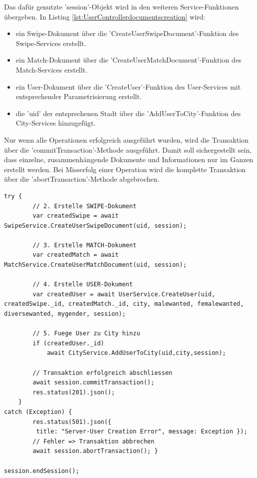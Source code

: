 \noindent
Das dafür genutzte 'session'-Objekt wird in den weiteren Service-Funktionen übergeben. In Listing \ref{lst:UserControllerdocumentscreation} wird:
\begin{itemize}
\item ein Swipe-Dokument über die 'CreateUserSwipeDocument'-Funktion des Swipe-Services erstellt.
\item ein Match-Dokument über die 'CreateUserMatchDocument'-Funktion des Match-Services erstellt. 
\item ein User-Dokument über die 'CreateUser'-Funktion des User-Services mit entsprechender Parametrisierung erstellt.
\item die 'uid' der entsprechenen Stadt über die 'AddUserToCity'-Funktion des City-Services hinzugefügt.
 \end{itemize}
Nur wenn alle Operationen erfolgreich ausgeführt wurden, wird die Transaktion über die 'commit\-Transaction'-Methode ausgeführt. Damit soll sichergestellt sein, dass einzelne, zusammenhängende Dokumente und Informationen nur im Ganzen erstellt werden. Bei Misserfolg einer Operation wird die komplette Transaktion über die 'abortTransaction'-Methode abgebrochen.\\

\begin{lstlisting}[caption=UserController - Create User - Dokumente erstellen, label=lst:UserControllerdocumentscreation]
try {
        // 2. Erstelle SWIPE-Dokument
        var createdSwipe = await SwipeService.CreateUserSwipeDocument(uid, session);

        // 3. Erstelle MATCH-Dokument
        var createdMatch = await MatchService.CreateUserMatchDocument(uid, session);

        // 4. Erstelle USER-Dokument
        var createdUser = await UserService.CreateUser(uid, createdSwipe._id, createdMatch._id, city, malewanted, femalewanted, diversewanted, mygender, session);

        // 5. Fuege User zu City hinzu
        if (createdUser._id)
            await CityService.AddUserToCity(uid,city,session);
            
        // Transaktion erfolgreich abschliessen
        await session.commitTransaction();
        res.status(201).json();
    }
catch (Exception) {
        res.status(501).json({
         title: "Server-User Creation Error", message: Exception });
        // Fehler => Transaktion abbrechen
        await session.abortTransaction(); }
        
session.endSession();
\end{lstlisting}
   
